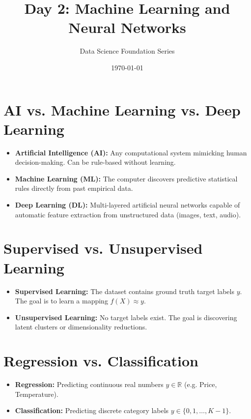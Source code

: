 \documentclass[11pt,a4paper]{article}
\title{\textbf{Day 2: Machine Learning and Neural Networks}}
\author{Data Science Foundation Series}
\date{\today}
\begin{document}
\maketitle

\section{AI vs. Machine Learning vs. Deep Learning}
\begin{itemize}
    \item \textbf{Artificial Intelligence (AI):} Any computational system mimicking human decision-making. Can be rule-based without learning.
    \item \textbf{Machine Learning (ML):} The computer discovers predictive statistical rules directly from past empirical data.
    \item \textbf{Deep Learning (DL):} Multi-layered artificial neural networks capable of automatic feature extraction from unstructured data (images, text, audio).
\end{itemize}

\section{Supervised vs. Unsupervised Learning}
\begin{itemize}
    \item \textbf{Supervised Learning:} The dataset contains ground truth target labels $y$. The goal is to learn a mapping $f(X) \approx y$.
    \item \textbf{Unsupervised Learning:} No target labels exist. The goal is discovering latent clusters or dimensionality reductions.
\end{itemize}

\section{Regression vs. Classification}
\begin{itemize}
    \item \textbf{Regression:} Predicting continuous real numbers $y \in \mathbb{R}$ (e.g. Price, Temperature).
    \item \textbf{Classification:} Predicting discrete category labels $y \in \{0, 1, \dots, K-1\}$.
\end{itemize}
\end{document}
